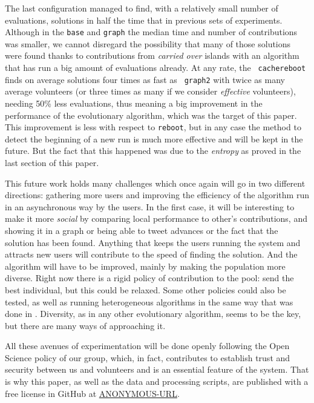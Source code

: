 \documentclass[runningheads,a4paper]{llncs}\usepackage[]{graphicx}\usepackage[]{color}
\begin{document}
The last configuration managed to find, with a relatively small number
of evaluations, solutions in half the time that in previous sets of
experiments. Although in the {\tt base} and {\tt graph} the median
time and number of contributions was smaller, we cannot disregard the
possibility that many of those solutions were found thanks to
contributions from {\em carried over} islands with an algorithm that
has run a big amount of evaluations already. At any rate, the {\tt
  cachereboot} finds on average solutions four times as fast as {\tt
  graph2} with twice as many average volunteers (or three times as
many if we consider {\em effective} volunteers), needing 50\% less
evaluations, thus meaning a big improvement in the performance of the
evolutionary algorithm, which was the target of this paper. This
improvement is less with respect to {\tt reboot}, but in any case the
method to detect the beginning of a new run is much more effective and
will be kept in the future. But the fact that this happened was due to
the {\em entropy} as proved in the last section of this paper. 

This future work holds many challenges which once again will go in two
different directions: gathering more users and improving the
efficiency of the algorithm run in an asynchronous way by the
users. In the first case, it will be interesting to make it more {\em
  social} by comparing local performance to other's contributions, and
showing it in a graph or being able to tweet advances or the fact that
the solution has been found. Anything that keeps the users running the
system and attracts new users will contribute to the speed of finding
the solution. And the algorithm will have to be improved, mainly by
making the population more diverse. Right now there is a rigid policy
of contribution to the pool: send the best individual, but this could
be relaxed. Some other policies could also be tested, as well as
running heterogeneous algorithms in the same way that was done in
\cite{DBLP:journals/grid/ValdezTGVO15anonymous}. Diversity, as in any other
evolutionary algorithm, seems to be the key, but there are many ways of
approaching it. 

All these avenues of experimentation will be done openly following the
Open Science policy of our group, which, in fact, contributes to
establish trust and security between us and volunteers and is an
essential feature of the system. That is why this paper, as well as
the data and processing scripts, are published with a free license in GitHub at
\url{ANONYMOUS-URL}.
\end{document}
